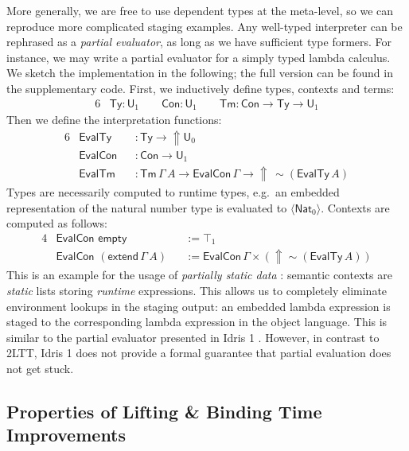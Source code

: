 \documentclass[acmsmall,anonymous,review]{acmart}
\newcommand{\msf}[1]{\mathsf{#1}}
\newcommand{\Lift}{{\Uparrow}}
\newcommand{\spl}{{\sim}}
\newcommand{\qut}[1]{\langle #1\rangle}
\renewcommand{\U}{\msf{U}}
\newcommand{\Con}{\msf{Con}}
\newcommand{\Ty}{\msf{Ty}}
\newcommand{\Tm}{\msf{Tm}}
\newcommand{\Nat}{\msf{Nat}}
\theoremstyle{remark}
\begin{document}
More generally, we are free to use dependent types at the meta-level, so we can
reproduce more complicated staging examples. Any well-typed interpreter can be
rephrased as a \emph{partial evaluator}, as long as we have sufficient type
formers. For instance, we may write a partial evaluator for a simply typed
lambda calculus. We sketch the implementation in the following; the full version
can be found in the supplementary code. First, we inductively define types,
contexts and terms:
\begin{alignat*}{6}
  & \Ty : \U_1  \hspace{2em} \Con : \U_1 \hspace{2em} \Tm : \Con \to \Ty \to \U_1
\end{alignat*}
Then we define the interpretation functions:
\begin{alignat*}{6}
  & \msf{EvalTy}  &&: \Ty \to \Lift \U_0 \\
  & \msf{EvalCon} &&: \Con \to \U_1 \\
  & \msf{EvalTm}  &&: \Tm\,\Gamma\,A \to \msf{EvalCon}\,\Gamma \to \Lift\,\spl(\msf{EvalTy}\,A)
\end{alignat*}
Types are necessarily computed to runtime types, e.g.\ an embedded
representation of the natural number type is evaluated to $\qut{\Nat_0}$.
Contexts are computed as follows:
\begin{alignat*}{4}
  &\msf{EvalCon}\,\,\msf{empty}                &&:= \top_1 \\
  &\msf{EvalCon}\,\,(\msf{extend}\,\Gamma\,A) &&:= \msf{EvalCon}\,\Gamma \times (\Lift \spl(\msf{EvalTy}\,A))
\end{alignat*}
This is an example for the usage of \emph{partially static data} \cite{partial-evaluation}:
semantic contexts are \emph{static} lists storing \emph{runtime}
expressions. This allows us to completely eliminate environment lookups in the
staging output: an embedded lambda expression is staged to the corresponding
lambda expression in the object language. This is similar to the partial
evaluator presented in Idris 1 \cite{scrap-your-inefficient-engine}. However, in
contrast to 2LTT, Idris 1 does not provide a formal guarantee that partial
evaluation does not get stuck.

\subsection{Properties of Lifting \& Binding Time Improvements}
\end{document}
